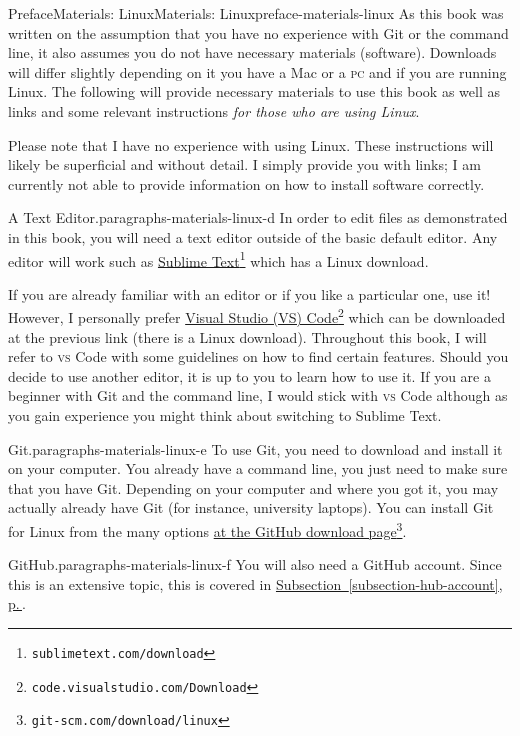 \documentclass[twoside,10pt,]{book}
\newcommand{\xreffont}{\relax}
\newcommand{\initialism}[1]{\textsc{\MakeLowercase{#1}}}
\begin{document}
%
%
\typeout{************************************************}
\typeout{************************************************}
%
\begin{preface}{Preface}{Materials: Linux}{}{Materials: Linux}{}{}{preface-materials-linux}
As this book was written on the assumption that you have no experience with Git or the command line, it also assumes you do not have necessary materials (software). Downloads will differ slightly depending on it you have a Mac or a \initialism{PC} and if you are running Linux. The following will provide necessary materials to use this book as well as links and some relevant instructions \emph{for those who are using Linux}.%
\par
Please note that I have no experience with using Linux. These instructions will likely be superficial and without detail. I simply provide you with links; I am currently not able to provide information on how to install software correctly.%
\begin{paragraphs}{A Text Editor.}{paragraphs-materials-linux-d}%
In order to edit files as demonstrated in this book, you will need a text editor outside of the basic default editor. Any editor will work such as \href{https://www.sublimetext.com/download}{Sublime Text}\footnote{\nolinkurl{sublimetext.com/download}\label{fn-materials-linux-d-b-b}} which has a Linux download.%
\par
If you are already familiar with an editor or if you like a particular one, use it! However, I personally prefer \href{https://code.visualstudio.com/Download}{Visual Studio (VS) Code}\footnote{\nolinkurl{code.visualstudio.com/Download}\label{fn-materials-linux-d-c-b}} which can be downloaded at the previous link (there is a Linux download). Throughout this book, I will refer to \initialism{VS} Code with some guidelines on how to find certain features. Should you decide to use another editor, it is up to you to learn how to use it. If you are a beginner with Git and the command line, I would stick with \initialism{VS} Code although as you gain experience you might think about switching to Sublime Text.%
\end{paragraphs}%
\begin{paragraphs}{Git.}{paragraphs-materials-linux-e}%
To use Git, you need to download and install it on your computer. You already have a command line, you just need to make sure that you have Git. Depending on your computer and where you got it, you may actually already have Git (for instance, university laptops). You can install Git for Linux from the many options \href{https://git-scm.com/download/linux}{at the GitHub download page}\footnote{\nolinkurl{git-scm.com/download/linux}\label{fn-materials-linux-e-b-b}}.%
\end{paragraphs}%
\begin{paragraphs}{GitHub.}{paragraphs-materials-linux-f}%
You will also need a GitHub account. Since this is an extensive topic, this is covered in \hyperref[subsection-hub-account]{Subsection~{\xreffont\ref{subsection-hub-account}}, p.\,\pageref{subsection-hub-account}}.%
\end{paragraphs}%
\end{preface}
\end{document}
